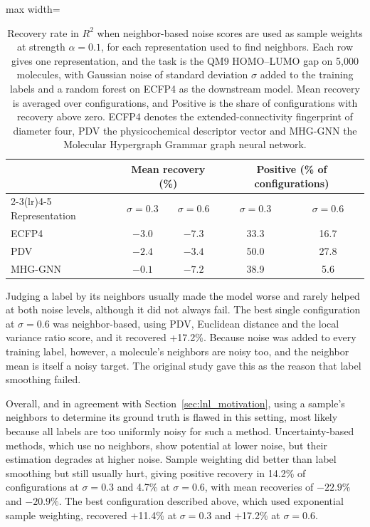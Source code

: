 \begin{table}[htbp]
\centering
\begin{adjustbox}{max width=\textwidth}
\begin{tabular}{lcccc}
\toprule
 & \multicolumn{2}{c}{Mean recovery (\%)} & \multicolumn{2}{c}{Positive (\% of configurations)} \\
\cmidrule(lr){2-3}\cmidrule(lr){4-5}
Representation & $\sigma = 0.3$ & $\sigma = 0.6$ & $\sigma = 0.3$ & $\sigma = 0.6$ \\
\midrule
ECFP4   & $-3.0$ & $-7.3$ & 33.3 & 16.7 \\
PDV     & $-2.4$ & $-3.4$ & 50.0 & 27.8 \\
MHG-GNN & $-0.1$ & $-7.2$ & 38.9 & 5.6 \\
\bottomrule
\end{tabular}
\end{adjustbox}
\caption[Recovery with neighbor-based sample weights by representation.]{Recovery rate in $R^2$ when neighbor-based noise scores are used as sample weights at strength $\alpha = 0.1$, for each representation used to find neighbors. Each row gives one representation, and the task is the QM9 HOMO--LUMO gap on 5,000 molecules, with Gaussian noise of standard deviation $\sigma$ added to the training labels and a random forest on ECFP4 as the downstream model. Mean recovery is averaged over configurations, and Positive is the share of configurations with recovery above zero. ECFP4 denotes the extended-connectivity fingerprint of diameter four, PDV the physicochemical descriptor vector and MHG-GNN the Molecular Hypergraph Grammar graph neural network.}
\label{tab:code_input_neighbor_recovery}
\end{table}

Judging a label by its neighbors usually made the model worse and rarely helped at both noise levels, although it did not always fail. The best single configuration at $\sigma = 0.6$ was neighbor-based, using PDV, Euclidean distance and the local variance ratio score, and it recovered +17.2\%. Because noise was added to every training label, however, a molecule's neighbors are noisy too, and the neighbor mean is itself a noisy target. The original study gave this as the reason that label smoothing failed.

Overall, and in agreement with Section~\ref{sec:lnl_motivation}, using a sample's neighbors to determine its ground truth is flawed in this setting, most likely because all labels are too uniformly noisy for such a method. Uncertainty-based methods, which use no neighbors, show potential at lower noise, but their estimation degrades at higher noise. Sample weighting did better than label smoothing but still usually hurt, giving positive recovery in 14.2\% of configurations at $\sigma = 0.3$ and 4.7\% at $\sigma = 0.6$, with mean recoveries of $-22.9\%$ and $-20.9\%$. The best configuration described above, which used exponential sample weighting, recovered +11.4\% at $\sigma = 0.3$ and +17.2\% at $\sigma = 0.6$.

